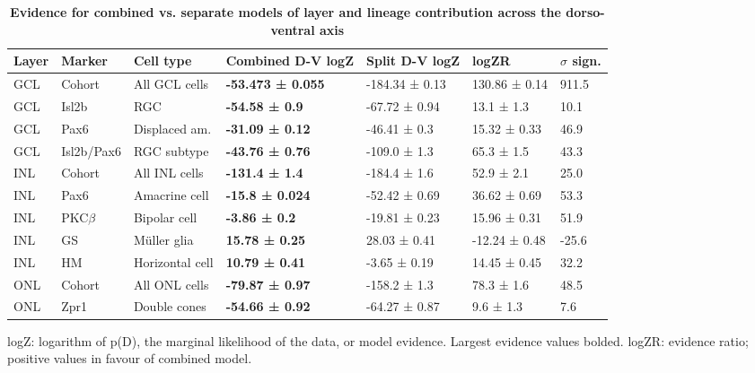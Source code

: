 \begin{table}[!ht]
    \caption{{\bf Evidence for combined vs. separate models of layer and lineage contribution across the dorso-ventral axis}}
    \begin{tabular}{|l|l|l|l|l|l|l|} 
        \hline
        {\bf Layer} & {\bf Marker} & {\bf Cell type} & {\bf Combined D-V logZ} & {\bf Split D-V logZ} & {\bf logZR} & {\bf $\sigma$ sign.}\\ \hline \hline
        GCL & Cohort & All GCL cells & {\bf -53.473 ± 0.055} & -184.34 ± 0.13 & 130.86 ± 0.14 & 911.5\\ \hline \hline
        GCL & Isl2b & RGC & {\bf -54.58 ± 0.9} & -67.72 ± 0.94 & 13.1 ± 1.3 & 10.1\\ \hline
        GCL & Pax6 & Displaced am. & {\bf -31.09 ± 0.12} & -46.41 ± 0.3 & 15.32 ± 0.33 & 46.9\\ \hline
        GCL & Isl2b/Pax6 & RGC subtype & {\bf -43.76 ± 0.76} & -109.0 ± 1.3 & 65.3 ± 1.5 & 43.3\\ \hline \hline
        INL & Cohort & All INL cells & {\bf -131.4 ± 1.4} & -184.4 ± 1.6 & 52.9 ± 2.1 & 25.0\\ \hline \hline
        INL & Pax6 & Amacrine cell & {\bf -15.8 ± 0.024} & -52.42 ± 0.69 & 36.62 ± 0.69 & 53.3\\ \hline
        INL & PKC$\beta$ & Bipolar cell & {\bf -3.86 ± 0.2} & -19.81 ± 0.23 & 15.96 ± 0.31 & 51.9\\ \hline
        INL & GS & M\"{u}ller glia & {\bf 15.78 ± 0.25} & 28.03 ± 0.41 & -12.24 ± 0.48 & -25.6\\ \hline
        INL & HM & Horizontal cell & {\bf 10.79 ± 0.41} & -3.65 ± 0.19 & 14.45 ± 0.45 & 32.2\\ \hline \hline
        ONL & Cohort & All ONL cells & {\bf -79.87 ± 0.97} & -158.2 ± 1.3 & 78.3 ± 1.6 & 48.5\\ \hline \hline
        ONL & Zpr1 & Double cones & {\bf -54.66 ± 0.92} & -64.27 ± 0.87 & 9.6 ± 1.3 & 7.6\\ \hline
    \end{tabular}
\begin{flushleft}logZ: logarithm of p(D), the marginal likelihood of the data, or model evidence.  Largest evidence values bolded. logZR: evidence ratio; positive values in favour of combined model.
\end{flushleft}
\label{lineage_dvev}
\end{table}

